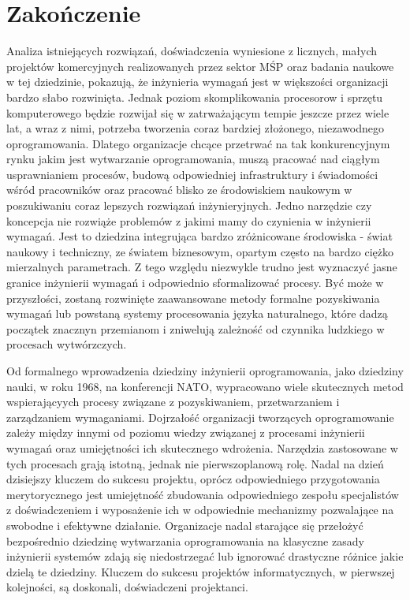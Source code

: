     
  \section{Zakończenie}

    Analiza istniejących rozwiązań, doświadczenia wyniesione z licznych, małych projektów komercyjnych realizowanych przez sektor MŚP oraz badania naukowe w tej dziedzinie, pokazują, że inżynieria wymagań jest w większości organizacji bardzo słabo rozwinięta. Jednak poziom skomplikowania procesorow i sprzętu komputerowego będzie rozwijał się w zatrważającym tempie jeszcze przez wiele lat, a wraz z nimi, potrzeba tworzenia coraz bardziej złożonego, niezawodnego oprogramowania. Dlatego organizacje chcące przetrwać na tak konkurencyjnym rynku jakim jest wytwarzanie oprogramowania, muszą pracować nad ciągłym usprawnianiem procesów, budową odpowiedniej infrastruktury i świadomości wśród pracowników oraz pracować blisko ze środowiskiem naukowym w poszukiwaniu coraz lepszych rozwiązań inżynieryjnych. Jedno narzędzie czy koncepcja nie rozwiąże problemów z jakimi mamy do czynienia w inżynierii wymagań. Jest to dziedzina integrująca bardzo zróżnicowane środowiska - świat naukowy i techniczny, ze światem biznesowym, opartym często na bardzo ciężko mierzalnych parametrach. Z tego względu niezwykle trudno jest wyznaczyć jasne granice inżynierii wymagań i odpowiednio sformalizować procesy. Być może w przyszłości, zostaną rozwinięte zaawansowane metody formalne pozyskiwania wymagań lub powstaną systemy procesowania języka naturalnego, które dadzą początek znacznyn przemianom i zniwelują zależność od czynnika ludzkiego w procesach wytwórzczych. 

    Od formalnego wprowadzenia dziedziny inżynierii oprogramowania, jako dziedziny nauki, w roku 1968, na konferencji NATO, wypracowano wiele skutecznych metod wspierającyych procesy związane z pozyskiwaniem, przetwarzaniem i zarządzaniem wymaganiami. Dojrzałość organizacji tworzących oprogramowanie zależy między innymi od poziomu wiedzy związanej z procesami inżynierii wymagań oraz umiejętności ich skutecznego wdrożenia. Narzędzia zastosowane w tych procesach grają istotną, jednak nie pierwszoplanową rolę. Nadal na dzień dzisiejszy kluczem do sukcesu projektu, oprócz odpowiedniego przygotowania merytorycznego jest umiejętność zbudowania odpowiedniego zespołu specjalistów z doświadczeniem i wyposażenie ich w odpowiednie mechanizmy pozwalające na swobodne i efektywne działanie. Organizacje nadal starające się przełożyć bezpośrednio dziedzinę wytwarzania oprogramowania na klasyczne zasady inżynierii systemów zdają się niedostrzegać lub ignorować drastyczne różnice jakie dzielą te dziedziny. Kluczem do sukcesu projektów informatycznych, w pierwszej kolejności, są doskonali, doświadczeni projektanci.

\blacksquare
